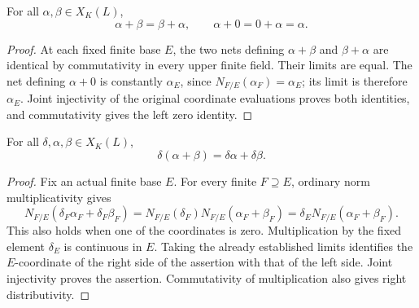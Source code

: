\begin{lemma}
\label{fw:norm-limit-addition-identities}
\leanok
For all $\alpha,\beta\in X_K(L)$,
\[
 \alpha+\beta=\beta+\alpha,\qquad \alpha+0=0+\alpha=\alpha.
\]
\end{lemma}
\begin{proof}
At each fixed finite base $E$, the two nets defining
$\alpha+\beta$ and $\beta+\alpha$ are identical by commutativity
in every upper finite field. Their limits are equal.
The net defining $\alpha+0$ is constantly $\alpha_E$, since
$N_{F/E}(\alpha_F)=\alpha_E$; its limit is therefore $\alpha_E$.
Joint injectivity of the original coordinate evaluations proves both
identities, and commutativity gives the left zero identity.
\end{proof}

\begin{lemma}
\label{fw:norm-limit-distributivity}
\leanok
For all $\delta,\alpha,\beta\in X_K(L)$,
\[
 \delta(\alpha+\beta)=\delta\alpha+\delta\beta.
\]
\end{lemma}
\begin{proof}
Fix an actual finite base $E$. For every finite $F\supseteq E$,
ordinary norm multiplicativity gives
\[
 N_{F/E}(\delta_F\alpha_F+\delta_F\beta_F)
 =N_{F/E}(\delta_F)N_{F/E}(\alpha_F+\beta_F)
 =\delta_E N_{F/E}(\alpha_F+\beta_F).
\]
This also holds when one of the coordinates is zero.
Multiplication by the fixed element $\delta_E$ is continuous in $E$.
Taking the already established limits identifies the $E$-coordinate
of the right side of the assertion with that of the left side.
Joint injectivity proves the assertion. Commutativity of multiplication
also gives right distributivity.
\end{proof}

